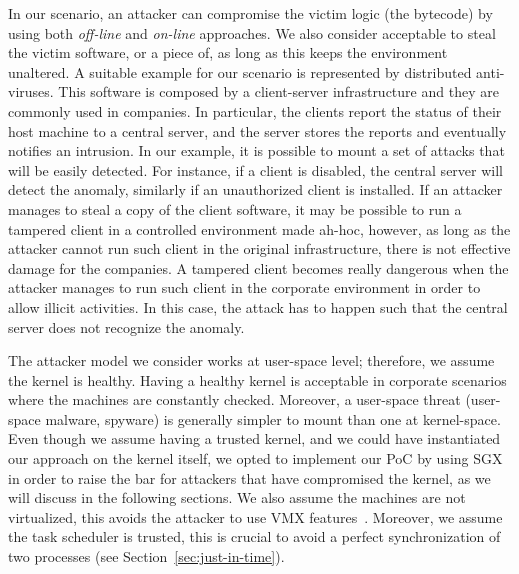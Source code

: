 In our scenario, an attacker can compromise the victim logic (\ie the bytecode) 
by using both \emph{off-line} and \emph{on-line} approaches.
We also consider acceptable to steal the victim software, or a piece of, as 
long as this keeps the environment unaltered.
A suitable example for our scenario is represented by distributed anti-viruses. 
This software is composed by a client-server infrastructure and they are 
commonly used in companies. 
In particular, the clients report the status of their host machine to a central 
server, and the server stores the reports and eventually notifies an intrusion.
In our example, it is possible to mount a set of attacks that will be easily 
detected.
For instance, if a client is disabled, the central server will detect the 
anomaly, similarly if an unauthorized client is installed.
If an attacker manages to steal a copy of the client software, it may be 
possible to run a tampered client in a controlled environment made ah-hoc, 
however, as long as the attacker cannot run such client in the original 
infrastructure, there is not effective damage for the companies.
A tampered client becomes really dangerous when the attacker manages to run 
such client in the corporate environment in order to 
allow illicit activities. In this case, the attack has to happen such that the 
central server does not recognize the anomaly.

The attacker model we consider works at user-space level; therefore, we assume 
the kernel is healthy.
Having a healthy kernel is acceptable in corporate scenarios where the machines 
are constantly checked.
Moreover, a user-space threat (\eg user-space malware, spyware) is generally 
simpler to mount than one at kernel-space.
Even though we assume having a trusted kernel, and we could have  instantiated 
our approach on the kernel itself, we opted to implement our PoC by using SGX 
in order to raise the bar for attackers that have compromised the kernel, as we 
will discuss in the following sections.
We also assume the machines are not virtualized, this avoids the attacker to 
use VMX features~\cite{uhlig2005intel}.
Moreover, we assume the task scheduler is trusted, this is crucial to avoid a 
perfect synchronization of two processes (see Section~\ref{sec:just-in-time}).

